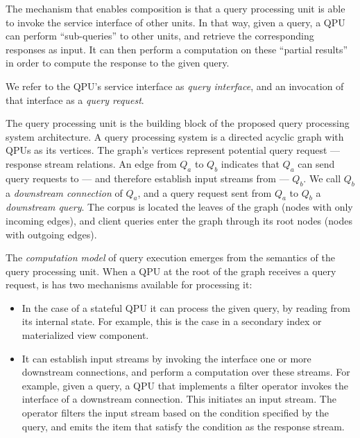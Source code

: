 The mechanism that enables composition is that a query processing unit is able to invoke the service interface
of other units.
In that way, given a query, a QPU can perform ``sub-queries'' to other units,
and retrieve the corresponding responses as input.
It can then perform a computation on these ``partial results'' in order to compute the response to the given query.

We refer to the QPU's service interface as \textit{query interface},
and an invocation of that interface as a \textit{query request}.


\medskip
\noindent
The query processing unit is the building block of the proposed query processing system architecture.
A query processing system is a directed acyclic graph with QPUs as its vertices.
The graph's vertices represent potential query request --- response stream relations.
An edge from $Q_a$ to $Q_b$ indicates that $Q_a$ can send query requests to
--- and therefore establish input streams from --- $Q_b$.
We call $Q_b$ a \textit{downstream connection} of $Q_a$, and a query request sent from $Q_a$ to $Q_b$ a \textit{downstream query}.
The corpus is located the leaves of the graph (nodes with only incoming edges),
and client queries enter the graph through its root nodes (nodes with outgoing edges).

\medskip
\noindent
The \textit{computation model} of query execution emerges from the semantics of the query processing unit.
When a QPU at the root of the graph receives a query request,
is has two mechanisms available for processing it:
\begin{itemize}
  \item In the case of a stateful QPU it can process the given query, by reading from its internal state.
  For example, this is the case in a secondary index or materialized view component.

  \item It can establish input streams by invoking the interface one or more downstream connections,
  and perform a computation over these streams.
  For example, given a query, a QPU that implements a filter operator invokes the interface of a downstream connection.
  This initiates an input stream.
  The operator filters the input stream based on the condition specified by the query,
  and emits the item that satisfy the condition as the response stream.
\end{itemize}

